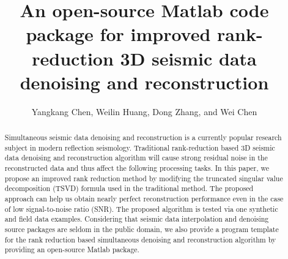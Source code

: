 \title{An open-source Matlab code package for improved  rank-reduction 3D  seismic data denoising and reconstruction}

\renewcommand{\thefootnote}{\fnsymbol{footnote}}
\author{Yangkang Chen\footnotemark[1], Weilin Huang\footnotemark[2], Dong Zhang\footnotemark[2], and Wei Chen\footnotemark[3]}
\address{
\footnotemark[1]Bureau of Economic Geology \\
John A. and Katherine G. Jackson School of Geosciences \\
The University of Texas at Austin \\
University Station, Box X \\
Austin, TX 78713-8924 \\
Email: ykchen@utexas.edu \\
\footnotemark[2] State Key Laboratory of Petroleum Resources and Prospecting \\
China University of Petroleum \\
Fuxue Road 18th\\
Beijing, China, 102200 \\
cup\_hwl@126.com  \&  zhangdongconan@163.com \\
\footnotemark[3]
School of Geophysics and Oil Resource \\
Yangtze University\\
Jingzhou, Hubei Province, China, 434023\\
chenwei2014@yangtzeu.edu.cn 
}

\maketitle
{}

\begin{abstract}
Simultaneous seismic data denoising and reconstruction is a currently popular research subject in modern reflection seismology. Traditional rank-reduction based 3D seismic data denoising and reconstruction algorithm will cause strong residual noise in the reconstructed data and thus affect the following processing tasks. In this paper, we propose an improved rank reduction method by  modifying the truncated singular value decomposition (TSVD) formula used in the traditional method. The proposed approach can help us obtain nearly perfect reconstruction performance even in the case of low signal-to-noise ratio (SNR). The proposed algorithm is tested via one synthetic and field data examples. Considering that seismic data interpolation and denoising source packages are seldom in the public domain, we also provide a program template for the rank reduction based simultaneous denoising and reconstruction algorithm by providing an open-source Matlab package. 
\end{abstract}


